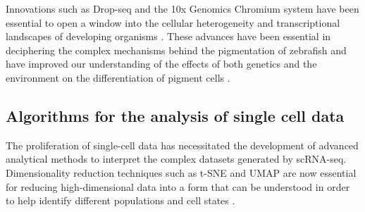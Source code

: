 \documentclass[runningheads]{llncs}
\begin{document}
Innovations such as Drop-seq and the 10x Genomics Chromium system have been essential to open a window into the cellular heterogeneity and transcriptional landscapes of developing organisms \cite{nayak2021hitchhiker}. These advances have been essential in deciphering the complex mechanisms behind the pigmentation of zebrafish and have improved our understanding of the effects of both genetics and the environment on the differentiation of pigment cells \cite{qiu2017reversed}.

\subsection{Algorithms for the analysis of single cell data}
The proliferation of single-cell data has necessitated the development of advanced analytical methods to interpret the complex datasets generated by scRNA-seq. Dimensionality reduction techniques such as t-SNE and UMAP are now essential for reducing high-dimensional data into a form that can be understood in order to help identify different populations and cell states \cite{kulkarni2019beyond,nayak2021hitchhiker}.
\end{document}
